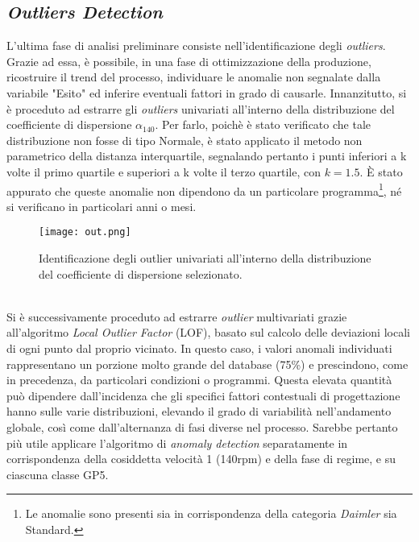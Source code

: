 \documentclass[fleqn,10pt]{SelfArx} %
\begin{document}
\subsection{\textit{Outliers Detection}}
L'ultima fase di analisi preliminare consiste nell'identificazione degli \textit{outliers}. Grazie ad essa, è possibile, in una fase di ottimizzazione della produzione, ricostruire il trend del processo, individuare le anomalie non segnalate dalla variabile "Esito" ed inferire eventuali fattori in grado di causarle. Innanzitutto, si è proceduto ad estrarre gli \textit{outliers} univariati all'interno della distribuzione del coefficiente di dispersione $\alpha_{140}$. Per farlo, poichè è stato verificato che tale distribuzione non fosse di tipo Normale, è stato applicato il metodo non parametrico della distanza interquartile, segnalando pertanto i punti inferiori a k volte il primo quartile e superiori a k volte il terzo quartile, con $k = 1.5$. È stato appurato che queste anomalie non dipendono da un particolare programma\footnote{Le anomalie sono presenti sia in corrispondenza della categoria \textit{Daimler} sia Standard.}, né si verificano in particolari anni o mesi.
\begin{figure}[h]
    \centering
    \texttt{[image: out.png]}
    \label{fig:em}
    \caption{Identificazione degli outlier univariati all'interno della distribuzione del coefficiente di dispersione selezionato.}
\end{figure}
\\
Si è successivamente proceduto ad estrarre \textit{outlier} multivariati grazie all'algoritmo \textit{Local Outlier Factor} (LOF), basato sul calcolo delle deviazioni locali di ogni punto dal proprio vicinato. In questo caso, i valori anomali individuati rappresentano un porzione molto grande del database (75\%) e prescindono, come in precedenza, da particolari condizioni o programmi. Questa elevata quantità può dipendere dall'incidenza che gli specifici fattori contestuali di progettazione hanno sulle varie distribuzioni, elevando il grado di variabilità nell'andamento globale, così come dall'alternanza di fasi diverse nel processo. Sarebbe pertanto più utile applicare l'algoritmo di \textit{anomaly detection} separatamente in corrispondenza della cosiddetta velocità 1 (140rpm) e della fase di regime, e su ciascuna classe GP5.
\end{document}

